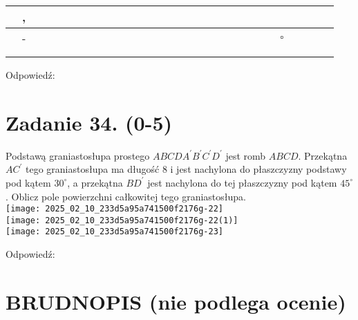 \documentclass[10pt]{article}
\begin{document}
\begin{center}
\begin{tabular}{|c|c|c|c|c|c|c|c|c|c|c|c|c|c|c|c|c|c|c|c|c|c|c|c|c|c|c|c|c|}
\hline
 & , &  &  &  &  &  &  &  &  &  &  &  &  &  &  &  &  &  &  &  &  &  &  &  &  &  &  &  \\
\hline
 & - &  &  &  &  &  &  &  &  &  &  &  &  &  &  &  &  &  &  &  &  &  &  & \(\square\) &  &  &  &  \\
\hline
 &  &  &  &  &  &  &  &  &  &  &  &  &  &  &  &  &  &  &  &  &  &  &  &  &  &  &  &  \\
\hline
 &  &  &  &  &  &  &  &  &  &  &  &  &  &  &  &  &  &  &  &  &  &  &  &  &  &  &  &  \\
\hline
\end{tabular}
\end{center}

Odpowiedź: \(\qquad\)

\section*{Zadanie 34. (0-5)}
Podstawą graniastosłupa prostego \(A B C D A^{\prime} B^{\prime} C^{\prime} D^{\prime}\) jest romb \(A B C D\). Przekątna \(A C^{\prime}\) tego graniastosłupa ma długość 8 i jest nachylona do płaszczyzny podstawy pod kątem \(30^{\circ}\), a przekątna \(B D^{\prime}\) jest nachylona do tej płaszczyzny pod kątem \(45^{\circ}\). Oblicz pole powierzchni całkowitej tego graniastosłupa.\\
\texttt{[image: 2025\_02\_10\_233d5a95a741500f2176g-22]}\\
\texttt{[image: 2025\_02\_10\_233d5a95a741500f2176g-22(1)]}\\
\texttt{[image: 2025\_02\_10\_233d5a95a741500f2176g-23]}

Odpowiedź:

\section*{BRUDNOPIS (nie podlega ocenie)}
\end{document}
